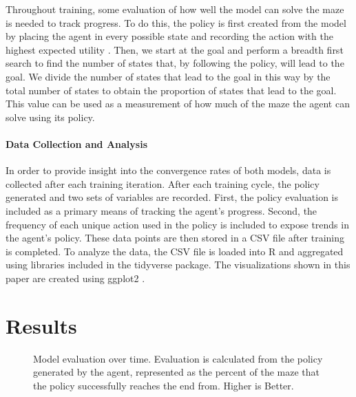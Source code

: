 \documentclass[12pt]{article}
\begin{document}
Throughout training, some evaluation of how well the model can solve the maze is needed to track progress.
To do this, the policy is first created from the model by placing the agent in every possible state and recording the action with the highest expected utility \cite{article_reinforcement_learning_survey}.
Then, we start at the goal and perform a breadth first search to find the number of states that, by following the policy, will lead to the goal.
We divide the number of states that lead to the goal in this way by the total number of states to obtain the proportion of states that lead to the goal.
This value can be used as a measurement of how much of the maze the agent can solve using its policy.

\paragraph{Data Collection and Analysis}


In order to provide insight into the convergence rates of both models, data is collected after each training iteration.
After each training cycle, the policy generated and two sets of variables are recorded.
First, the policy evaluation is included as a primary means of tracking the agent's progress.
Second, the frequency of each unique action used in the policy is included to expose trends in the agent's policy.
These data points are then stored in a CSV file after training is completed.
To analyze the data, the CSV file is loaded into R \cite{lang_r} and aggregated using libraries included in the tidyverse \cite{lib_tidyverse} package.
The visualizations shown in this paper are created using ggplot2 \cite{lib_ggplot2}.

\section{Results}

\begin{figure}[h]
	\begin{center}
		
	\end{center}
	\caption{Model evaluation over time. Evaluation is calculated from the policy generated by the agent, represented as the percent of the maze that the policy successfully reaches the end from. Higher is Better.}
	\label{fig:evaluation}
\end{figure}
\end{document}
